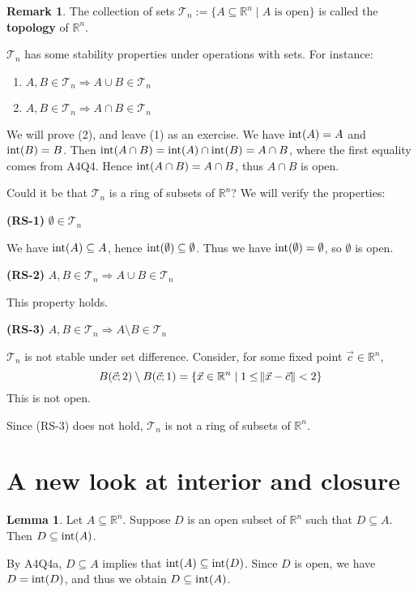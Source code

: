 \documentclass[11pt]{article}
\makeatletter
\theoremstyle{definition}
\newtheorem{lemma}[thm]{Lemma}
\newtheorem{remark}[thm]{Remark}
\newcommand{\R}{\ensuremath{\mathbb{R}}}
\newenvironment{pf}[1][\proofname]{\par
  \pushQED{\qed}%
  \normalfont \topsep0\p@\relax
  \trivlist
  \item[\hskip\labelsep\itshape
  #1\@addpunct{.}]\ignorespaces
}{%
  \popQED\endtrivlist\@endpefalse
}
\makeatother
\begin{document}
\begin{remark}
The collection of sets $\mathcal{T}_n := \{A \subseteq \R^n \mid A \text{ is open}\}$ is called the {\bf topology} of $\R^n$. 

$\mathcal{T}_n$ has some stability properties under operations with sets. For instance:\vspace{-1.5ex}
\begin{enumerate}[(1)]
\item $A, B \in \mathcal{T}_n \Rightarrow A \cup B \in \mathcal{T}_n$
\item $A, B \in \mathcal{T}_n \Rightarrow A \cap B \in \mathcal{T}_n$
\end{enumerate}
\vspace{-1.5ex}
We will prove (2), and leave (1) as an exercise. We have ${\rm int}(A) = A$ and ${\rm int}(B) = B$. Then ${\rm int}(A \cap B) = {\rm int}(A) \cap {\rm int}(B) = A \cap B$, where the first equality comes from A4Q4. Hence ${\rm int}(A \cap B) = A \cap B$, thus $A \cap B$ is open. 

Could it be that $\mathcal{T}_n$ is a ring of subsets of $\R^n$? We will verify the properties:

{\bf (RS-1)} $\emptyset \in \mathcal{T}_n$

We have ${\rm int}(A) \subseteq A$, hence ${\rm int}(\emptyset) \subseteq \emptyset$. Thus we have ${\rm int}(\emptyset) = \emptyset$, so $\emptyset$ is open.

{\bf (RS-2)} $A, B \in \mathcal{T}_n \Rightarrow A \cup B \in \mathcal{T}_n$

This property holds.

{\bf (RS-3)} $A, B \in \mathcal{T}_n \Rightarrow A \setminus B \in \mathcal{T}_n$

$\mathcal{T}_n$ is not stable under set difference. Consider, for some fixed point $\vec{c} \in \R^n$,
\[ B(\vec{c}; 2) \setminus B(\vec{c}; 1) = \{\vec{x} \in \R^n \mid 1 \leq \norm{\vec{x} - \vec{c}} < 2\} \]
This is not open.

Since (RS-3) does not hold, $\mathcal{T}_n$ is not a ring of subsets of $\R^n$.
\end{remark}

\newpage
\section{A new look at interior and closure}

\begin{lemma}
Let $A \subseteq \R^n$. Suppose $D$ is an open subset of $\R^n$ such that $D \subseteq A$. Then $D \subseteq {\rm int}(A)$. 
\end{lemma}
\begin{pf}
By A4Q4a, $D \subseteq A$ implies that ${\rm int}(A) \subseteq {\rm int}(D)$. Since $D$ is open, we have $D = {\rm int}(D)$, and thus we obtain $D \subseteq {\rm int}(A)$.
\end{pf}
\end{document}
